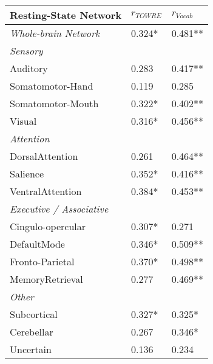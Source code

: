 \begin{tabular}{L{5cm}L{2cm}L{2cm}}
\toprule
Resting-State Network & $r_{TOWRE}$ & $r_{Vocab}$ \\
\midrule
\textit{Whole-brain Network}           &  0.324* & 0.481** \\
\textit{Sensory} & & \\
\hspace{3pt}Auditory          &        0.283 &       0.417**  \\
\hspace{3pt}Somatomotor-Hand  &        0.119 &       0.285    \\
\hspace{3pt}Somatomotor-Mouth &        0.322* &       0.402** \\
\hspace{3pt}Visual            &        0.316* &       0.456** \\
\textit{Attention} & & \\
\hspace{3pt}DorsalAttention   &        0.261 &       0.464**  \\
\hspace{3pt}Salience          &        0.352* &       0.416** \\
\hspace{3pt}VentralAttention  &        0.384* &       0.453** \\
\textit{Executive / Associative} & & \\
\hspace{3pt}Cingulo-opercular &        0.307* &       0.271   \\
\hspace{3pt}DefaultMode       &        0.346* &       0.509** \\
\hspace{3pt}Fronto-Parietal   &        0.370* &       0.498** \\
\hspace{3pt}MemoryRetrieval   &        0.277 &       0.469**  \\
\textit{Other} & & \\
\hspace{3pt}Subcortical       &        0.327* &       0.325*  \\
\hspace{3pt}Cerebellar        &        0.267 &       0.346*   \\
\hspace{3pt}Uncertain         &        0.136 &       0.234    \\
\bottomrule
\end{tabular}